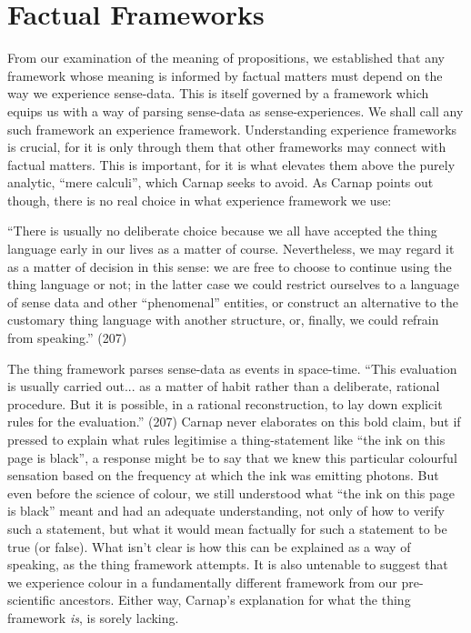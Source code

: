 \documentclass[12pt]{article}
\begin{document}
\section{Factual Frameworks}

From our examination of the meaning of propositions, we established that any framework whose meaning is informed by factual matters must depend on the way we experience sense-data. This is itself governed by a framework which equips us with a way of parsing sense-data as sense-experiences. We shall call any such framework an experience framework. Understanding experience frameworks is crucial, for it is only through them that other frameworks may connect with factual matters. This is important, for it is what elevates them above the purely analytic, ``mere calculi'', which Carnap seeks to avoid. As Carnap points out though, there is no real choice in what experience framework we use:

\begin{displayquote}
``There is usually no deliberate choice because we all have accepted the thing language early in our lives as a matter of course. Nevertheless, we may regard it as a matter of decision in this sense: we are free to choose to continue using the thing language or not; in the latter case we could restrict ourselves to a language of sense data and other ``phenomenal'' entities, or construct an alternative to the customary thing language with another structure, or, finally, we could refrain from speaking.'' (207)
\end{displayquote}

The thing framework parses sense-data as events in space-time. ``This evaluation is usually carried out... as a matter of habit rather than a deliberate, rational procedure. But it is possible, in a rational reconstruction, to lay down explicit rules for the evaluation.'' (207) Carnap never elaborates on this bold claim, but if pressed to explain what rules legitimise a thing-statement like ``the ink on this page is black'', a response might be to say that we knew this particular colourful sensation based on the frequency at which the ink was emitting photons. But even before the science of colour, we still understood what ``the ink on this page is black'' meant and had an adequate understanding, not only of how to verify such a statement, but what it would mean factually for such a statement to be true (or false). What isn't clear is how this can be explained as a way of speaking, as the thing framework attempts. It is also untenable to suggest that we experience colour in a fundamentally different framework from our pre-scientific ancestors. Either way, Carnap's explanation for what the thing framework \textit{is}, is sorely lacking.
\end{document}

